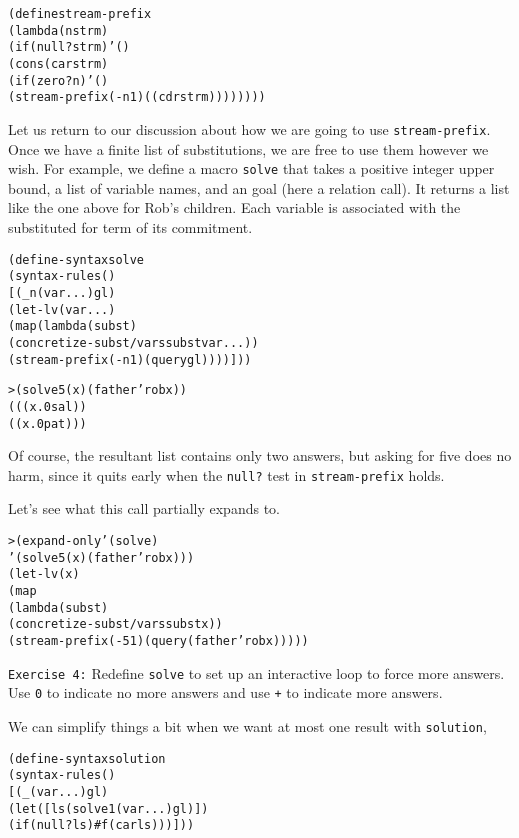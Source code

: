 \begin{alltt}
(define stream-prefix
  (lambda (n strm)
    (if (null? strm) '()
      (cons (car strm)
        (if (zero? n) '()
          (stream-prefix (- n 1) ((cdr strm))))))))
\end{alltt}

Let us return to our discussion about how we are going to use
\texttt{stream-prefix}.  Once we have a finite list of substitutions,
we are free to use them however we wish. For example, we define a
macro \texttt{solve} that takes a positive integer upper bound, a list
of variable names, and an goal (here a relation call).  It
returns a list like the one above for Rob's children.  Each variable
is associated with the substituted for term of its commitment.

\begin{alltt}
(define-syntax solve
  (syntax-rules ()
    [(_ n (var ...) gl)
     (let-lv (var ...)
       (map (lambda (subst)
              (concretize-subst/vars subst var ...))
         (stream-prefix (- n 1) (query gl))))]))
\end{alltt}

\begin{alltt}
> (solve 5 (x) (father 'rob x))
(((x.0 sal))
 ((x.0 pat)))
\end{alltt}

\noindent
Of course, the resultant list contains only two answers, but
asking for five does no harm, since it quits early when the
\texttt{null?} test in \texttt{stream-prefix} holds.

Let's see what this call partially expands to.
\begin{alltt}
> (expand-only '(solve)
    '(solve 5 (x) (father 'rob x)))
(let-lv (x)
  (map
    (lambda (subst)
      (concretize-subst/vars subst x))
    (stream-prefix (- 5 1) (query (father 'rob x)))))
\end{alltt}

\noindent
\texttt{Exercise 4:} Redefine \texttt{solve} to set up an interactive
loop to force more answers.  Use \texttt{0} to indicate no more
answers and use \texttt{+} to indicate more answers.\endofexercise

We can simplify things a bit when we want at most one result with
\texttt{solution},

\begin{alltt}
(define-syntax solution
  (syntax-rules ()
    [(_ (var ...) gl)
     (let ([ls (solve 1 (var ...) gl)])
       (if (null? ls) #f (car ls)))]))
\end{alltt}

